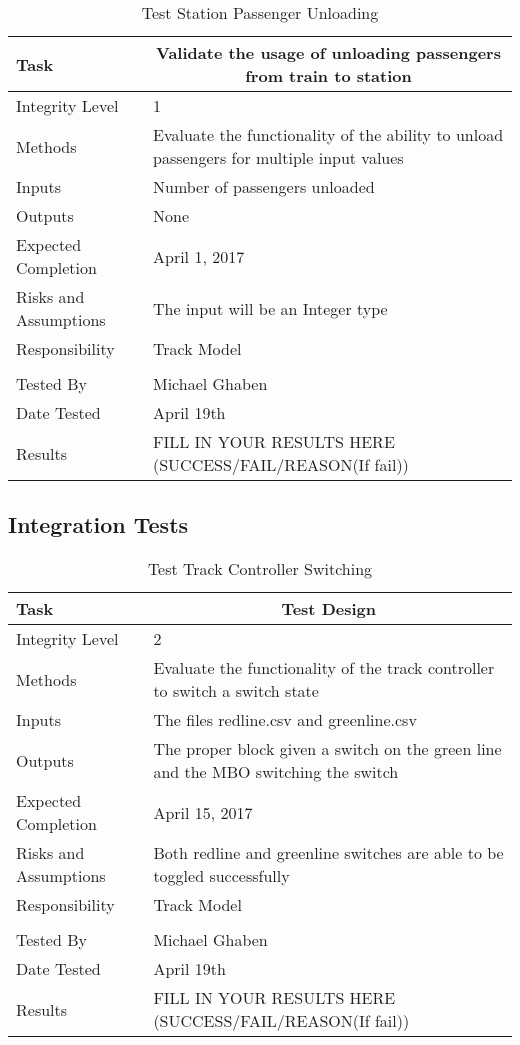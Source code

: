 \documentclass[]{article}
\begin{document}
\begin{table}[H]
	\centering
	\caption{Test Station Passenger Unloading}
	\begin{tabular}{|l|l|}
		\hline
		Task & \multicolumn{1}{c|}{Validate the usage of unloading passengers from train to station} \\ \hline
		Integrity Level & 1 \\ \hline
		Methods & Evaluate the functionality of the ability to unload passengers for multiple input values \\ \hline
		Inputs &  Number of passengers unloaded\\ \hline
		Outputs &  \parbox[t]{10cm}{None}\\ \hline
		Expected Completion & April 1, 2017\\ \hline
		Risks and Assumptions & The input will be an Integer type \\ \hline
		Responsibility & Track Model\\ \hline
		\\ \hline
		Tested By   &  Michael Ghaben\\	\hline
		Date Tested & \parbox[t]{10cm}{April 19th}\\ \hline
		Results & FILL IN YOUR RESULTS HERE (SUCCESS/FAIL/REASON(If fail))\\ \hline
	\end{tabular}
\end{table}




\subsection{Integration Tests}

\begin{table}[H]
	\centering
	\caption{Test Track Controller Switching}
	\begin{tabular}{|l|l|}
		\hline
		Task & \multicolumn{1}{c|}{Test Design} \\ \hline
		Integrity Level & 2 \\ \hline
		Methods & Evaluate the functionality of the track controller to switch a switch state \\ \hline
		Inputs &  The files redline.csv and greenline.csv \\ \hline
		Outputs &  \parbox[t]{10cm}{The proper block given a switch on the green line and the MBO switching the switch}\\ \hline
		Expected Completion & April 15, 2017\\ \hline
		Risks and Assumptions & Both redline and greenline switches are able to be toggled successfully \\ \hline
		Responsibility & Track Model\\ \hline
		\\ \hline
		Tested By   &  Michael Ghaben\\	\hline
		Date Tested & \parbox[t]{10cm}{April 19th}\\ \hline
		Results & FILL IN YOUR RESULTS HERE (SUCCESS/FAIL/REASON(If fail))\\ \hline
	\end{tabular}
\end{table}
\end{document}
